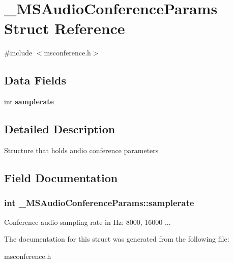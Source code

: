 \section{\_\-MSAudioConferenceParams Struct Reference}
\label{struct__MSAudioConferenceParams}


{\ttfamily \#include $<$msconference.h$>$}\subsection*{Data Fields}
\begin{DoxyCompactItemize}
\item 
int {\bf samplerate}
\end{DoxyCompactItemize}


\subsection{Detailed Description}
Structure that holds audio conference parameters 

\subsection{Field Documentation}
\subsubsection[{samplerate}]{\setlength{\rightskip}{0pt plus 5cm}int {\bf \_\-MSAudioConferenceParams::samplerate}}\label{struct__MSAudioConferenceParams_a9ee6b148963e984df1c841c2abb92c42}
Conference audio sampling rate in Hz: 8000, 16000 ... 

The documentation for this struct was generated from the following file:\begin{DoxyCompactItemize}
\item 
msconference.h\end{DoxyCompactItemize}
